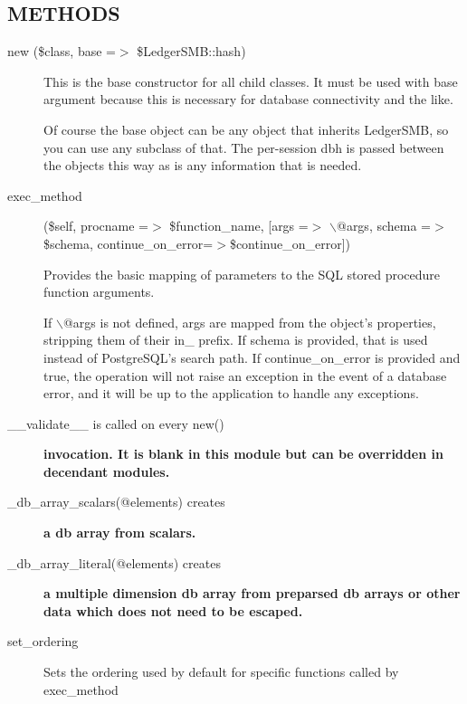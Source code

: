 \begin{description}
\begin{description}
\begin{description}
\begin{description}
\begin{description}
\subsection*{METHODS\label{LedgerSMB::DBObject_METHODS}}
\begin{description}

\item[{new (\$class, base =$>$ \$LedgerSMB::hash)}] \mbox{}

This is the base constructor for all child classes.  It must be used with base
argument because this is necessary for database connectivity and the like.



Of course the base object can be any object that inherits LedgerSMB, so you can
use any subclass of that.  The per-session dbh is passed between the objects 
this way as is any information that is needed.


\item[{exec\_method}] \mbox{}

(\$self, procname =$>$ \$function\_name, [args =$>$ $\backslash$@args, schema =$>$ \$schema,
continue\_on\_error=$>$\$continue\_on\_error])



Provides the basic mapping of parameters to the SQL stored procedure function 
arguments.



If $\backslash$@args is not defined, args are mapped from the object's properties, 
stripping them of their in\_ prefix.  If schema is provided, that is used 
instead of PostgreSQL's search path.  If continue\_on\_error is provided and true,
the operation will not raise an exception in the event of a database error, and 
it will be up to the application to handle any exceptions.


\item[{\_\_validate\_\_ is called on every new()}] \textbf{invocation. It is blank in this module but can be overridden in decendant modules.}
\item[{\_db\_array\_scalars(@elements) creates}] \textbf{a db array from scalars.}
\item[{\_db\_array\_literal(@elements) creates}] \textbf{a multiple dimension db array from 	preparsed db arrays or other data which does not need to be escaped.}
\item[{set\_ordering}] \mbox{}

Sets the ordering used by default for specific functions called by exec\_method



\end{description}
\end{description}
\end{description}
\end{description}
\end{description}
\end{description}
